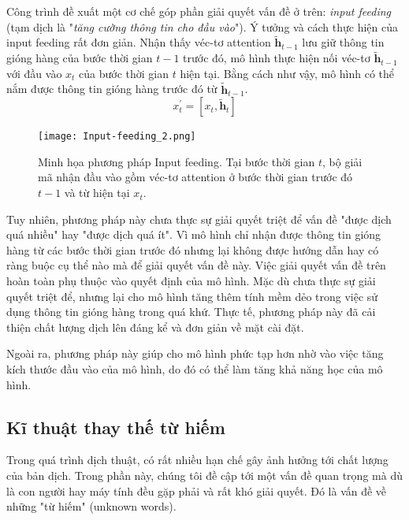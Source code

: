 Công trình \cite{attentionThangLuong2015} đề xuất một cơ chế góp phần giải quyết vấn đề ở trên: \textit{input feeding} (tạm dịch là "\textit{tăng cường thông tin cho đầu vào}"). Ý tưởng và cách thực hiện của input feeding rất đơn giản. Nhận thấy véc-tơ attention $\bm{\tilde{h}}_{t-1}$ lưu giữ thông tin gióng hàng của bước thời gian $t-1$ trước đó, mô hình thực hiện nối véc-tơ $\bm{\tilde{h}}_{t-1}$ với đầu vào $x_t$ của bước thời gian $t$ hiện tại. Bằng cách như vậy, mô hình có thể nắm được thông tin gióng hàng trước đó từ $\bm{\tilde{h}}_{t-1}$.
\begin{equation}
x^{'}_t = [x_t, \bm{\tilde{h}}_t]
\end{equation}

\begin{figure}
	\centering
	\texttt{[image: Input-feeding\_2.png]}
	\caption[Minh họa cơ chế Attention Cục bộ.]{Minh họa phương pháp Input feeding. Tại bước thời gian $t$, bộ giải mã nhận đầu vào gồm véc-tơ attention ở bước thời gian trước đó $t-1$ và từ hiện tại $x_t$.}
	\label{fig_Input_feeding}
\end{figure}
Tuy nhiên, phương pháp này chưa thực sự giải quyết triệt để vấn đề "được dịch quá nhiều" hay "được dịch quá ít". Vì mô hình chỉ nhận được thông tin gióng hàng từ các bước thời gian trước đó nhưng lại không được hướng dẫn hay có ràng buộc cụ thể nào mà để giải quyết vấn đề này. Việc giải quyết vấn đề trên hoàn toàn phụ thuộc vào quyết định của mô hình. Mặc dù chưa thực sự giải quyết triệt để, nhưng lại cho mô hình tăng thêm tính mềm dẻo trong việc sử dụng thông tin gióng hàng trong quá khứ. Thực tế, phương pháp này đã cải thiện chất lượng dịch lên đáng kể và đơn giản về mặt cài đặt.

Ngoài ra, phương pháp này giúp cho mô hình phức tạp hơn nhờ vào việc tăng kích thước đầu vào của mô hình, do đó có thể làm tăng khả năng học của mô hình.

\subsection{Kĩ thuật thay thế từ hiếm}
Trong quá trình dịch thuật, có rất nhiều hạn chế gây ảnh hưởng tới chất lượng của bản dịch. Trong phần này, chúng tôi đề cập tới một vấn đề quan trọng mà dù là con người hay máy tính đều gặp phải và rất khó giải quyết. Đó là vấn đề về những "từ hiếm" (unknown words). 

